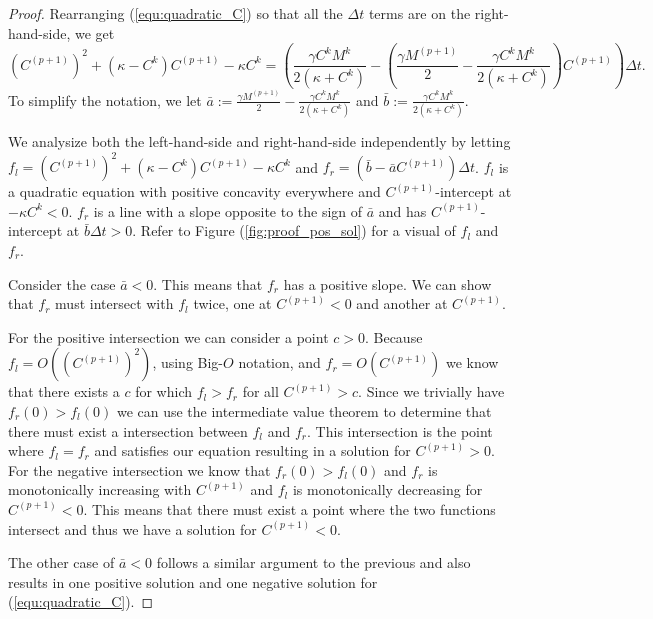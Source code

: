 \begin{proof}
  Rearranging (\ref{equ:quadratic_C}) so that all the $\Delta t$ terms are on the right-hand-side, we get
  \begin{equation}
    \left( C^{(p+1)} \right)^2 + \left(\kappa - C^{k}\right)C^{(p+1)} - \kappa C^{k} =  \left(\frac{\gamma C^k M^k}{2\left(\kappa + C^k\right)} - \left(\frac{\gamma M^{(p+1)}}{2} - \frac{\gamma C^k M^k}{2 \left(\kappa + C^k\right)} \right)C^{(p+1)} \right) \Delta t.
  \end{equation}
  To simplify the notation, we let $\bar{a} := \frac{\gamma M^{(p+1)}}{2} - \frac{\gamma C^k M^k}{2\left(\kappa + C^k\right)}$ and $\bar{b} := \frac{\gamma C^k M^k}{2\left(\kappa + C^k\right)}$.
  
  We analysize both the left-hand-side and right-hand-side independently by letting $f_l = \left( C^{(p+1)} \right)^2 + \left(\kappa - C^{k}\right)C^{(p+1)} - \kappa C^{k}$ and $f_r =  \left(\bar{b} - \bar{a} C^{(p+1)} \right) \Delta t$.
  $f_l$ is a quadratic equation with positive concavity everywhere and $C^{(p+1)}$-intercept at $-\kappa C^{k} < 0$.
  $f_r$ is a line with a slope opposite to the sign of $\bar{a}$ and has $C^{(p+1)}$-intercept at $\bar{b}\Delta t > 0$.
  Refer to Figure (\ref{fig:proof_pos_sol}) for a visual of $f_l$ and $f_r$.
  
  Consider the case $\bar{a} < 0$.
  This means that $f_r$ has a positive slope.
  We can show that $f_r$ must intersect with $f_l$ twice, one at $C^{(p+1)} <0$ and another at $C^{(p+1)}$.

  For the positive intersection we can consider a point $c > 0$.
  Because $f_l = O\left((C^{(p+1)})^2 \right)$, using Big-$O$ notation, and $f_r = O\left(C^{(p+1)}\right)$ we know that there exists a $c$ for which $f_l > f_r$ for all $C^{(p+1)} > c$.
  Since we trivially have $f_r(0) > f_l(0)$ we can use the intermediate value theorem to determine that there must exist a intersection between $f_l$ and $f_r$.
  This intersection is the point where $f_l = f_r$ and satisfies our equation resulting in a solution for $C^{(p+1)} > 0$. 
  For the negative intersection we know that $f_r(0) > f_l(0)$ and $f_r$ is monotonically increasing with $C^{(p+1)}$ and $f_l$ is monotonically decreasing for $C^{(p+1)} < 0$.
  This means that there must exist a point where the two functions intersect and thus we have a solution for $C^{(p+1)} < 0$.

  The other case of $\bar{a} < 0$ follows a similar argument to the previous and also results in one positive solution and one negative solution for (\ref{equ:quadratic_C}).
  
\end{proof}


